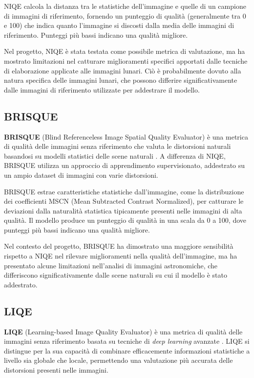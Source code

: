 NIQE calcola la distanza tra le statistiche dell'immagine e quelle di un campione di immagini di riferimento, fornendo un punteggio di qualità (generalmente tra 0 e 100) che indica quanto l'immagine si discosti dalla media delle immagini di riferimento. Punteggi più bassi indicano una qualità migliore.

Nel progetto, NIQE è stata testata come possibile metrica di valutazione, ma ha mostrato limitazioni nel catturare miglioramenti specifici apportati dalle tecniche di elaborazione applicate alle immagini lunari. Ciò è probabilmente dovuto alla natura specifica delle immagini lunari, che possono differire significativamente dalle immagini di riferimento utilizzate per addestrare il modello.

\subsection{BRISQUE} \label{subsec:brisque}

\textbf{BRISQUE} (Blind Referenceless Image Spatial Quality Evaluator) è una metrica di qualità delle immagini senza riferimento che valuta le distorsioni naturali basandosi su modelli statistici delle scene naturali \cite{brisque}. A differenza di NIQE, BRISQUE utilizza un approccio di apprendimento supervisionato, addestrato su un ampio dataset di immagini con varie distorsioni.

BRISQUE estrae caratteristiche statistiche dall'immagine, come la distribuzione dei coefficienti MSCN (Mean Subtracted Contrast Normalized), per catturare le deviazioni dalla naturalità statistica tipicamente presenti nelle immagini di alta qualità. Il modello produce un punteggio di qualità in una scala da 0 a 100, dove punteggi più bassi indicano una qualità migliore.

Nel contesto del progetto, BRISQUE ha dimostrato una maggiore sensibilità rispetto a NIQE nel rilevare miglioramenti nella qualità dell'immagine, ma ha presentato alcune limitazioni nell'analisi di immagini astronomiche, che differiscono significativamente dalle scene naturali su cui il modello è stato addestrato.

\subsection{LIQE} \label{subsec:liqe}

\textbf{LIQE} (Learning-based Image Quality Evaluator) è una metrica di qualità delle immagini senza riferimento basata su tecniche di \textit{deep learning} avanzate \cite{liqe}. LIQE si distingue per la sua capacità di combinare efficacemente informazioni statistiche a livello sia globale che locale, permettendo una valutazione più accurata delle distorsioni presenti nelle immagini.


